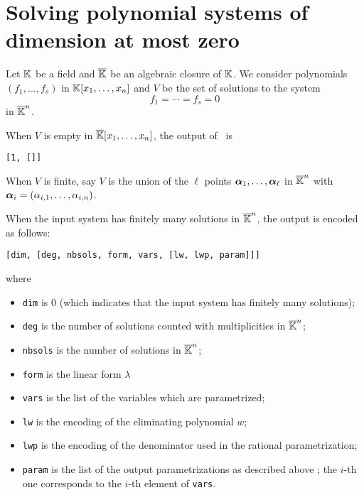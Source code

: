 \documentclass[a4paper,english,11pt]{scrartcl}
\theoremstyle{definition}
\theoremstyle{remark}
\begin{document}
\section{Solving polynomial systems of dimension at most zero}\label{sec:zerodim}

Let $\mathbb{K}$ be a field and $\overline{\mathbb{K}}$ be an algebraic closure of $\mathbb{K}$. We
consider polynomials $(f_1, \ldots, f_s)$  in $\mathbb{K}[x_1, \ldots,
x_n]$ and $V$ be the set of solutions to the system
\[
f_1=\cdots=f_s=0
\]
in $\overline{\mathbb{K}}^n$.

When $V$ is empty in $\overline{\mathbb{K}}[x_1, \ldots, x_n]$, the
output of \msolve~is
\begin{verbatim}
[1, []]
\end{verbatim}

When $V$ is finite, say $V$ is the union of the $\ell$ points $\bm{\alpha}_1,
\ldots, \bm{\alpha}_\ell$ in $\overline{\mathbb{K}}^n$ with $\bm{\alpha}_i = (\alpha_{i,1},
\ldots, \alpha_{i,n})$. 

When the input system has finitely many solutions in $\overline{\mathbb{K}}^n$, the
output is encoded as follows:
\begin{verbatim}
[dim, [deg, nbsols, form, vars, [lw, lwp, param]]]
\end{verbatim}
where
\begin{itemize}
\item \texttt{dim} is $0$ (which indicates that the input system has finitely
  many solutions);
\item \texttt{deg} is the number of solutions counted with multiplicities in
  $\overline{\mathbb{K}}^n$;
\item \texttt{nbsols} is the number of solutions in $\overline{\mathbb{K}}^n$; 
\item \texttt{form} is the linear form $\lambda$
\item \texttt{vars} is the list of the variables which are parametrized;
\item \texttt{lw} is the encoding of the eliminating polynomial $w$;
\item \texttt{lwp} is the encoding of the denominator used in the rational
  parametrization;
\item \texttt{param} is the list of the output parametrizations as described
  above ; the $i$-th one corresponds to the $i$-th element of \texttt{vars}.
\end{itemize}


\end{document}
